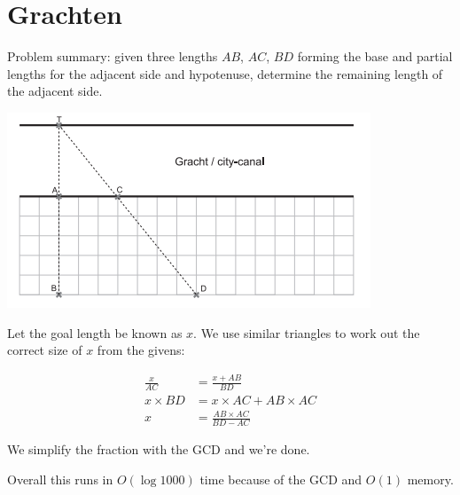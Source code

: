 \section{Grachten}

Problem summary: given three lengths $AB$, $AC$, $BD$ forming the base and
partial lengths for the adjacent side and hypotenuse, determine the remaining
length of the adjacent side.

\begin{center}
\includegraphics[scale=0.75]{f_diagram.png}
\end{center}

Let the goal length be known as $x$. We use similar triangles to work out the
correct size of $x$ from the givens:

\begin{align*}
  \frac{x}{AC} &= \frac{x+AB}{BD}             \\[3mm]
  x \times BD &= x \times AC + AB \times AC   \\[3mm]
  x &= \frac{AB \times AC}{BD - AC}
\end{align*}

We simplify the fraction with the GCD and we're done.

\vspace{0.5cm}
Overall this runs in $O(\log 1000)$ time because of the GCD and $O(1)$ memory.
